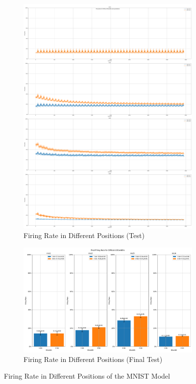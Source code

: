 \begin{figure}[H]
\begin{subfigure}[H]{0.48\textwidth}
                \includegraphics[width=\textwidth]{../firerate/MNIST/plots/mnist_test_firerate.pdf}
                \caption{Firing Rate in Different Positions (Test)}
            \end{subfigure}
            \hfill
            \begin{subfigure}[H]{\textwidth}
                \centering
                \includegraphics[width=\textwidth]{../firerate/MNIST/plots/mnist_final_firerate.pdf}
                \caption{Firing Rate in Different Positions (Final Test)}
            \end{subfigure}
            \caption{Firing Rate in Different Positions of the MNIST Model}
        \end{figure}

